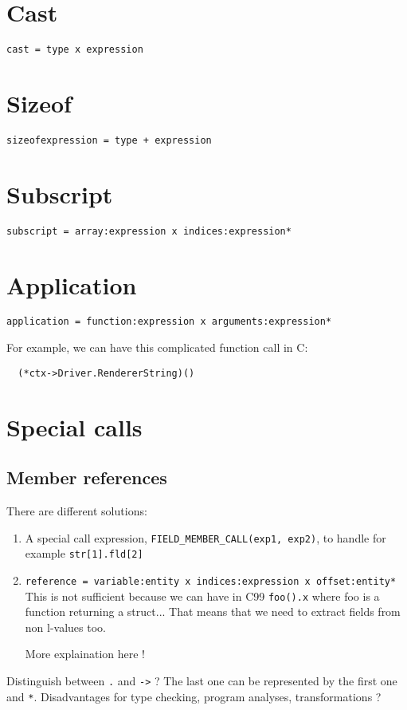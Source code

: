 \documentclass[a4paper]{report}
\begin{document}
\section{Cast}
\verb/cast = type x expression/

\section{Sizeof}
\verb/sizeofexpression = type + expression/

\section{Subscript}
\verb/subscript = array:expression x indices:expression*/

\section{Application}
\verb/application = function:expression x arguments:expression*/

For example, we can have this complicated function call in C:
\begin{lstlisting}
  (*ctx->Driver.RendererString)()
\end{lstlisting}


\section{Special calls }

\subsection{Member references }

There are different solutions:
\begin{enumerate}
\item A special call expression, \lstinline/FIELD_MEMBER_CALL(exp1, exp2)/, to handle for example
\lstinline|str[1].fld[2]|
\item
  \verb/reference = variable:entity x indices:expression x offset:entity*/
  This is not sufficient because we can have in C99 \lstinline|foo().x|
  where foo is a function returning a struct... That means that we need to
  extract fields from non l-values too.

More explaination here !
\end{enumerate}
 Distinguish between \texttt{.} and \verb/->/ ? The last one can be represented by
 the first one and \texttt{*}. 
 Disadvantages for type checking, program
analyses, transformations ?
\end{document}
